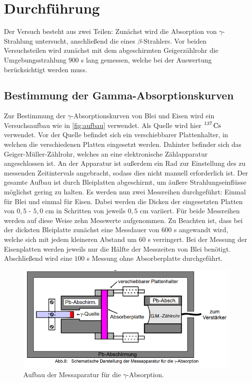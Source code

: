 \section{Durchführung}
\label{sec:Durchführung}
Der Versuch besteht aus zwei Teilen: Zunächst wird die Absorption von $\gamma$-Strahlung untersucht, anschließend die eines $\beta$-Strahlers.
Vor beiden Versuchsteilen wird zunächst mit dem abgeschirmten Geigerzählrohr die Umgebungsstrahlung $900$ s lang gemessen, welche bei der Auswertung 
berücksichtigt werden muss. 

\subsection{Bestimmung der Gamma-Absorptionskurven}
 Zur Bestimmung der $\gamma$-Absorptionskurven von Blei und Eisen wird ein Versuchsaufbau wie in \autoref{fig:aufbau} verwendet. Als 
 Quelle wird hier $\ce{^{137} Cs}$ verwendet. Vor der Quelle befindet sich ein verschiebbarer Plattenhalter, in welchen die verschiedenen Platten
 eingesetzt werden. Dahinter befinder sich das Geiger-Müller-Zählrohr, welches an eine elektronische Zählapparatur angeschlossen ist. 
 An der Apparatur ist außerdem ein Rad zur Einstellung des zu messenden Zeitintervals angebracht, sodass dies nicht manuell erforderlich ist.
Der gesamte Aufbau ist durch Bleiplatten abgeschirmt, um äußere Strahlungseinflüsse möglichst gering zu halten. Es werden nun zwei Messreihen
durchgeführt: Einmal für Blei und einmal für Eisen. Dabei werden die Dicken der eingesetzten Platten von $0,5$ - $5,0$ cm in Schritten von
jeweils $0,5$ cm variiert. Für beide Messreihen werden auf diese Weise zehn Messwerte aufgenommen. Zu Beachten ist, dass bei der dicksten Bleiplatte 
zunächst eine Messdauer von $600$ s angewandt wird, welche sich mit jedem kleineren Abstand um $60$ s verringert. Bei der Messung der Eisenplatten
werden jeweils nur die Hälfte der Messzeiten von Blei benötigt. Abschließend wird eine $100$ s Messung ohne Absorberplatte durchgeführt.
\begin{figure}
        \centering
        \includegraphics[width=\textwidth]{content/aufbau.png}
        \caption{Aufbau der Messaparatur für die $\gamma$-Absorption\cite[243]{V704}.}
        \label{fig:aufbau}
    \end{figure}

